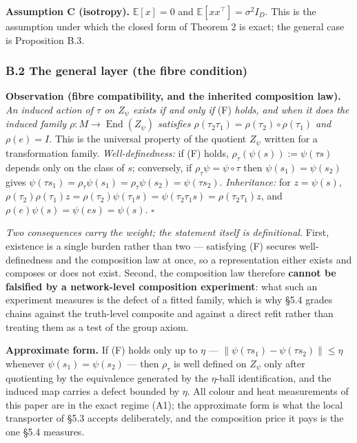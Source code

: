 \textbf{Assumption C (isotropy).} $\mathbb E[x]=0$ and $\mathbb E[xx^\top]=\sigma^2 I_D$. This is the assumption under which the closed form of Theorem 2 is exact; the general case is Proposition B.3.

\subsubsection*{B.2 The general layer (the fibre condition)}

\textbf{Observation (fibre compatibility, and the inherited composition law).} \textit{An induced action of $\tau$ on $Z_\psi$ exists if and only if} (F) \textit{holds, and when it does the induced family $\rho:M\to\operatorname{End}(Z_\psi)$ satisfies $\rho(\tau_2\tau_1)=\rho(\tau_2)\circ\rho(\tau_1)$ and $\rho(e)=I$.} This is the universal property of the quotient $Z_\psi$ written for a transformation family. \textit{Well-definedness:} if (F) holds, $\rho_\tau(\psi(s)):=\psi(\tau s)$ depends only on the class of $s$; conversely, if $\rho_\tau\psi=\psi\circ\tau$ then $\psi(s_1)=\psi(s_2)$ gives $\psi(\tau s_1)=\rho_\tau\psi(s_1)=\rho_\tau\psi(s_2)=\psi(\tau s_2)$. \textit{Inheritance:} for $z=\psi(s)$, $\rho(\tau_2)\rho(\tau_1)z=\rho(\tau_2)\psi(\tau_1s)=\psi(\tau_2\tau_1s)=\rho(\tau_2\tau_1)z$, and $\rho(e)\psi(s)=\psi(es)=\psi(s)$. $\square$

\textit{Two consequences carry the weight; the statement itself is definitional.} First, existence is a single burden rather than two --- satisfying (F) secures well-definedness and the composition law at once, so a representation either exists and composes or does not exist. Second, the composition law therefore \textbf{cannot be falsified by a network-level composition experiment}: what such an experiment measures is the defect of a fitted family, which is why \S{}5.4 grades chains against the truth-level composite and against a direct refit rather than treating them as a test of the group axiom.

\textbf{Approximate form.} If (F) holds only up to $\eta$ --- $\lVert\psi(\tau s_1)-\psi(\tau s_2)\rVert\le\eta$ whenever $\psi(s_1)=\psi(s_2)$ --- then $\rho_\tau$ is well defined on $Z_\psi$ only after quotienting by the equivalence generated by the $\eta$-ball identification, and the induced map carries a defect bounded by $\eta$. All colour and heat measurements of this paper are in the exact regime (A1); the approximate form is what the local transporter of \S{}5.3 accepts deliberately, and the composition price it pays is the one \S{}5.4 measures.

